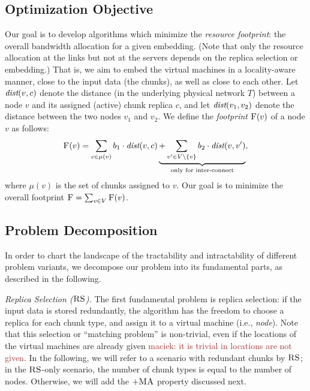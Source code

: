 \documentclass[9pt]{sigcomm-alternate}
\newcommand{\maciek}[1]{\textcolor{brown}{maciek: #1}}
\newcommand{\stefan}[1]{\textcolor{blue}{stefan: #1}}
\newcommand{\VirtualNodes}{\ensuremath{V}}
\newcommand{\achunk}{\ensuremath{c}}
\newcommand{\dist}{\emph{dist}}
\newcommand{\RS}{\textsc{RS}}
\newcommand{\MA}{\textsc{MA}}
\newcommand{\Cost}{\textsc{F}}
\newcommand{\Tree}{\ensuremath{T}}
\newcommand{\CostTrans}{\ensuremath{b_1}}
\newcommand{\CostCom}{\ensuremath{b_2}}
\begin{document}


\subsection{Optimization Objective}

Our goal is to develop algorithms which minimize
the \emph{resource footprint}: the overall bandwidth allocation for a given embedding. (Note that
only the resource allocation at the links but not at the servers depends on the replica selection or embedding.) That is,
we aim to embed the virtual machines in a locality-aware manner, close to the input data
(the chunks), as well as close to
each other. Let $\dist(v,\achunk)$ denote the distance (in the underlying physical network $\Tree$) between a node $v$ and
its assigned (active) chunk replica $\achunk$, and let $\dist(v_1,v_2)$ denote the distance between the two nodes $v_1$ and $v_2$.
We define the \emph{footprint} $\Cost(v)$ of a node $v$ as follows:
$$
\Cost(v) = \sum_{\achunk\in \mu(v)} \CostTrans \cdot \dist(v,\achunk) \underbrace{+ \sum_{v' \in \VirtualNodes\setminus\{v\}} \CostCom \cdot \dist(v,v')}_{\text{only for inter-connect}},
$$
\noindent where $\mu(v)$ is the set of chunks assigned to $v$. Our goal is to minimize the overall footprint
$\Cost=\sum_{v\in V} \Cost(v)$.


\subsection{Problem Decomposition}

In order to chart the landscape of the tractability and intractability of different
problem variants, we decompose our problem into its fundamental parts, as described in the following.

\emph{Replica Selection ($\RS$).} The first fundamental problem is replica selection:
if the input data is stored redundantly, the algorithm has the freedom to choose a replica
for each chunk type, and assign it to a virtual machine (i.e., \emph{node}). Note that this
selection or ``matching problem'' is non-trivial, even if the locations of the virtual machines
are already given \maciek{it is trivial in locations are not given}. In the following, we will refer to a scenario
with redundant chunks by $\RS$; in the $\RS$-only scenario, the number of chunk types
is equal to the number of nodes. Otherwise, we will add the $+\MA$ property discussed next.
\end{document}
